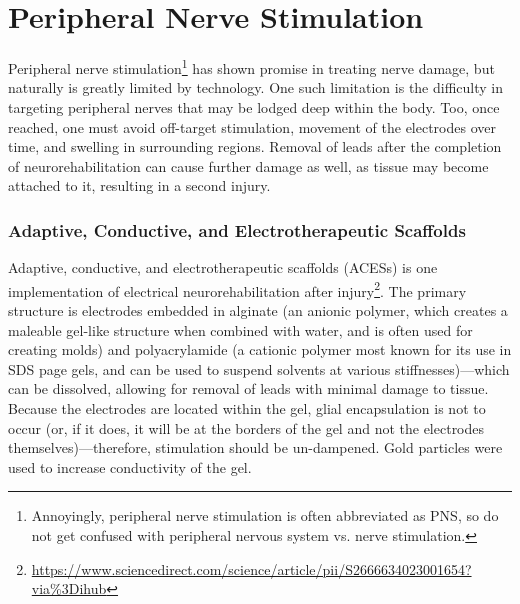 \chapter{Peripheral Nerve Stimulation} 
Peripheral nerve stimulation\footnote{Annoyingly, peripheral nerve stimulation is often abbreviated as PNS, so do not get confused with peripheral nervous system vs. nerve stimulation.} has shown promise in treating nerve damage, but naturally is greatly limited by technology. One such limitation is the difficulty in targeting peripheral nerves that may be lodged deep within the body. Too, once reached, one must avoid off-target stimulation, movement of the electrodes over time, and swelling in surrounding regions. Removal of leads after the completion of neurorehabilitation can cause further damage as well, as tissue may become attached to it, resulting in a second injury. 


\subsection{Adaptive, Conductive, and
Electrotherapeutic Scaffolds}
Adaptive, conductive, and electrotherapeutic scaffolds (ACESs) is one implementation of electrical neurorehabilitation after injury\footnote{\url{https://www.sciencedirect.com/science/article/pii/S2666634023001654?via\%3Dihub}}. The primary structure is electrodes embedded in alginate (an anionic polymer, which creates a maleable gel-like structure when combined with water, and is often used for creating molds) and polyacrylamide (a cationic polymer most known for its use in SDS page gels, and can be used to suspend solvents at various stiffnesses)---which can be dissolved, allowing for removal of leads with minimal damage to tissue. Because the electrodes are located within the gel, glial encapsulation is not to occur (or, if it does, it will be at the borders of the gel and not the electrodes themselves)---therefore, stimulation should be un-dampened. Gold particles were used to increase conductivity of the gel.\newline

